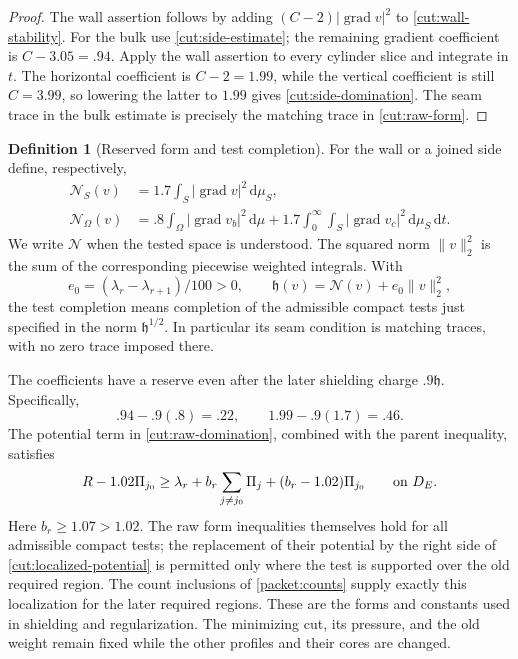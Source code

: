 \documentclass[11pt]{article}
\numberwithin{equation}{section}
\theoremstyle{definition}
\newtheorem{definition}[theorem]{Definition}
\theoremstyle{remark}
\begin{document}
\begin{proof}
The wall assertion follows by adding $(C-2)|\operatorname{grad} v|^2$ to
\cref{cut:wall-stability}.  For the bulk use
\cref{cut:side-estimate}; the remaining gradient coefficient is
$C-3.05=.94$.  Apply the wall assertion to every cylinder slice and
integrate in $t$.  The horizontal coefficient is $C-2=1.99$, while the
vertical coefficient is still $C=3.99$, so lowering the latter to $1.99$
gives \eqref{cut:side-domination}.  The seam trace in the bulk estimate
is precisely the matching trace in \eqref{cut:raw-form}.
\end{proof}

\begin{definition}[Reserved form and test completion]\label{cut:reserve}
For the wall or a joined side define, respectively,
\begin{align*}
 \mathcal N_S(v)&=1.7\int_S|\operatorname{grad} v|^2\,\mathrm d\mu_S,\\
 \mathcal N_\Omega(v)
   &=.8\int_\Omega|\operatorname{grad} v_b|^2\,\mathrm d\mu
       +1.7\int_0^\infty\!\int_S|\operatorname{grad} v_c|^2
                                            \,\mathrm d\mu_S\,\mathrm d t.
\end{align*}
We write $\mathcal N$ when the tested space is understood.  The squared norm
$\|v\|_2^2$ is the sum of the corresponding piecewise weighted integrals.
With
\[
                  e_0=(\lambda_r-\lambda_{r+1})/100>0,
 \qquad \mathfrak h(v)=\mathcal N(v)+e_0\|v\|_2^2,
\]
the test completion means completion of the admissible compact tests
just specified in the norm $\mathfrak h^{1/2}$.  In particular its seam
condition is matching traces, with no zero trace imposed there.
\end{definition}

The coefficients have a reserve even after the later shielding charge
$.9\mathfrak h$.  Specifically,
\begin{equation}\label{cut:remaining-gradient}
                       .94-.9(.8)=.22,
             \qquad 1.99-.9(1.7)=.46.
\end{equation}
The potential term in \cref{cut:raw-domination}, combined with the
parent inequality, satisfies
\begin{equation}\label{cut:localized-potential}
 R-1.02\Pi_{j_0}
 \ge\lambda_r+b_r\sum_{j\ne j_0}\Pi_j
                         +(b_r-1.02)\Pi_{j_0}
                       \qquad\hbox{on }D_E.
\end{equation}
Here $b_r\ge1.07>1.02$.  The raw form inequalities themselves hold for
all admissible compact tests; the replacement of their potential by
the right side of \eqref{cut:localized-potential} is permitted only
where the test is supported over the old required region.
The count inclusions of \cref{packet:counts} supply exactly this
localization for the later required regions.  These are the forms and
constants used in shielding and regularization.  The minimizing cut,
its pressure, and the old weight remain fixed while the other profiles
and their cores are changed.
\end{document}
